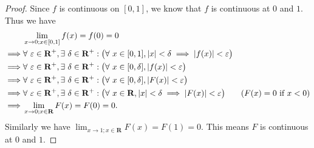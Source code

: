 \begin{proof}
    Since \(f\) is continuous on \([0, 1]\), we know that \(f\) is continuous at \(0\) and \(1\).
    Thus we have
    \begin{align*}
                 & \lim_{x \to 0 ; x \in [0, 1]} f(x) = f(0) = 0                                                                                                                                                      \\
        \implies & \forall\ \varepsilon \in \mathbf{R}^+, \exists\ \delta \in \mathbf{R}^+ : \big(\forall\ x \in [0, 1], \abs*{x} < \delta \implies \abs*{f(x)} < \varepsilon\big)                                    \\
        \implies & \forall\ \varepsilon \in \mathbf{R}^+, \exists\ \delta \in \mathbf{R}^+ : \big(\forall\ x \in [0, \delta], \abs*{f(x)} < \varepsilon\big)                                                          \\
        \implies & \forall\ \varepsilon \in \mathbf{R}^+, \exists\ \delta \in \mathbf{R}^+ : \big(\forall\ x \in [0, \delta], \abs*{F(x)} < \varepsilon\big)                                                          \\
        \implies & \forall\ \varepsilon \in \mathbf{R}^+, \exists\ \delta \in \mathbf{R}^+ : \big(\forall\ x \in \mathbf{R}, \abs*{x} < \delta \implies \abs*{F(x)} < \varepsilon\big) & (F(x) = 0 \text{ if } x < 0) \\
        \implies & \lim_{x \to 0 ; x \in \mathbf{R}} F(x) = F(0) = 0.
    \end{align*}
    Similarly we have \(\lim_{x \to 1 ; x \in \mathbf{R}} F(x) = F(1) = 0\).
    This means \(F\) is continuous at \(0\) and \(1\).


\end{proof}
